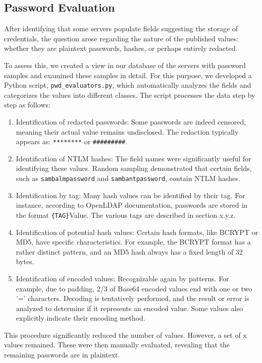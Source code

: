 \subsection{Password Evaluation}

After identifying that some servers populate fields suggesting the storage of credentials, the question arose regarding the nature of the published values: whether they are plaintext passwords, hashes, or perhaps entirely redacted.

To assess this, we created a view in our database of the servers with password samples and examined these samples in detail. For this purpose, we developed a Python script, \texttt{pwd\_evaluators.py}, which automatically analyzes the fields and categorizes the values into different classes. The script processes the data step by step as follows:

\begin{enumerate}
    \item Identification of redacted passwords: Some passwords are indeed censored, meaning their actual value remains undisclosed. The redaction typically appears as: \lstinline{********} or \lstinline{#########}.
    \item Identification of NTLM hashes: The field names were significantly useful for identifying these values. Random sampling demonstrated that certain fields, such as \texttt{sambalmpassword} and \texttt{sambantpassword}, contain NTLM hashes.
    \item Identification by tag: Many hash values can be identified by their tag. For instance, according to OpenLDAP documentation, passwords are stored in the format \lstinline|{TAG}|Value. The various tags are described in section x.y.z.
    \item Identification of potential hash values: Certain hash formats, like BCRYPT or MD5, have specific characteristics. For example, the BCRYPT format has a rather distinct pattern, and an MD5 hash always has a fixed length of 32 bytes.
    \item Identification of encoded values: Recognizable again by patterns. For example, due to padding, 2/3 of Base64 encoded values end with one or two '=' characters. Decoding is tentatively performed, and the result or error is analyzed to determine if it represents an encoded value. Some values also explicitly indicate their encoding method.
\end{enumerate}

This procedure significantly reduced the number of values. However, a set of x values remained. These were then manually evaluated, revealing that the remaining passwords are in plaintext.

